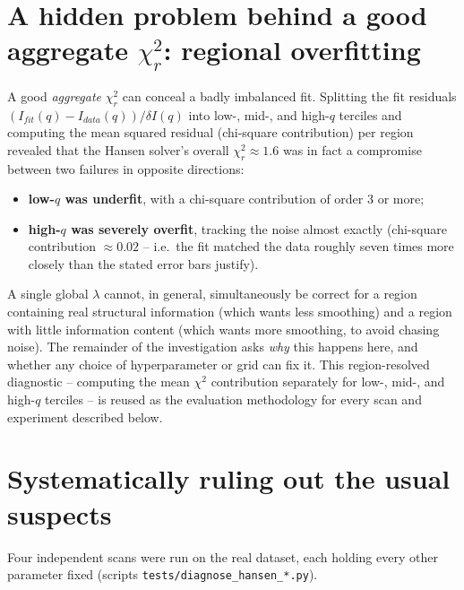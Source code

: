 \documentclass[11pt,a4paper]{article}
\begin{document}
\section{A hidden problem behind a good aggregate $\chi^2_r$: regional overfitting}
\label{sec:regional}

A good \emph{aggregate} $\chi^2_r$ can conceal a badly imbalanced fit.
Splitting the fit residuals $(I_{fit}(q) - I_{data}(q))/\delta I(q)$
into low-, mid-, and high-$q$ terciles and computing the mean squared
residual (chi-square contribution) per region revealed that the
Hansen solver's overall $\chi^2_r \approx 1.6$ was in fact a
compromise between two failures in opposite directions:
\begin{itemize}[nosep]
  \item \textbf{low-$q$ was underfit}, with a chi-square contribution
    of order 3 or more;
  \item \textbf{high-$q$ was severely overfit}, tracking the noise
    almost exactly (chi-square contribution $\approx 0.02$ -- i.e.\
    the fit matched the data roughly seven times more closely than the
    stated error bars justify).
\end{itemize}

A single global $\lambda$ cannot, in general, simultaneously be
correct for a region containing real structural information (which
wants less smoothing) and a region with little information content
(which wants more smoothing, to avoid chasing noise). The remainder of
the investigation asks \emph{why} this happens here, and whether any
choice of hyperparameter or grid can fix it. This region-resolved
diagnostic -- computing the mean $\chi^2$ contribution separately for
low-, mid-, and high-$q$ terciles -- is reused as the evaluation
methodology for every scan and experiment described below.

\section{Systematically ruling out the usual suspects}
\label{sec:scans}

Four independent scans were run on the real dataset, each holding
every other parameter fixed (scripts
\texttt{tests/diagnose\_hansen\_*.py}).
\end{document}
